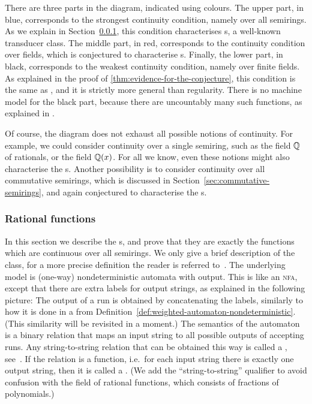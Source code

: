 There are three parts in the diagram, indicated using colours. The upper part, in blue, corresponds to the strongest continuity condition, namely over all semirings. As we explain in Section~\ref{sec:rational-functions}, this condition characterises s, a well-known transducer class. The middle part, in red, corresponds to the continuity condition over fields, which is conjectured to characterise s. Finally, the lower part, in black, corresponds to the weakest continuity condition, namely over finite fields. As explained in the proof of \cref{thm:evidence-for-the-conjecture}, this condition is the same as , and it is strictly more general than regularity. There is no machine model for the black part, because there are uncountably many such functions, as explained in \cite{bojanczykTitoRegular23}.

Of course, the diagram does not exhaust all possible notions of continuity. For example, we could consider continuity over a single semiring, such as the field ${\mathbb Q}$ of rationals, or the field ${\mathbb Q}(x)$. For all we know, even these notions might also characterise the s. Another possibility is to consider continuity over all commutative semirings, which is discussed in Section~\ref{sec:commutative-semirings}, and again conjectured to characterise the s.

\subsubsection{Rational functions}
\label{sec:rational-functions}
In this section we describe the s, and prove that they are exactly the functions which are continuous over all semirings.  We only give a brief description of the class, for a more precise definition the reader is referred to~\cite[Section 14.2]{bojanczyk_automata_2025}. The underlying model is (one-way) nondeterministic automata with output. This is like an \textsc{nfa}, except that there are extra labels for output strings, as  explained in the following picture: 
The output of a run is obtained by concatenating the labels, similarly to how it is done in a  from Definition~\ref{def:weighted-automaton-nondeterministic}. (This similarity will be revisited in a moment.) The semantics of the automaton is a binary relation that maps an input string to all possible outputs of accepting runs. Any string-to-string relation that can be obtained this way is called a , see~\cite[Chapter IX]{Eilenberg74}. If the relation is a function, i.e.~for each input string there is exactly one output string, then it is called a . (We add the ``string-to-string'' qualifier to avoid confusion with the field  of rational functions, which consists of fractions of polynomials.)  

